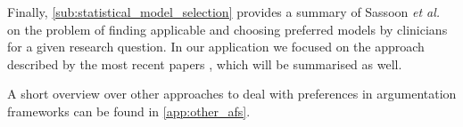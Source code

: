 Finally, \autoref{sub:statistical_model_selection} provides a summary of Sassoon \textit{et al.} \cite{sassoon2014} on the problem of finding applicable and choosing preferred models by clinicians for a given research question. In our application we focused on the approach described by the most recent papers \cite{sassoon2016,sassoon2016CD}, which will be summarised as well.





A short overview over other approaches to deal with preferences in argumentation frameworks can be found in \autoref{app:other_afs}. 


% 
